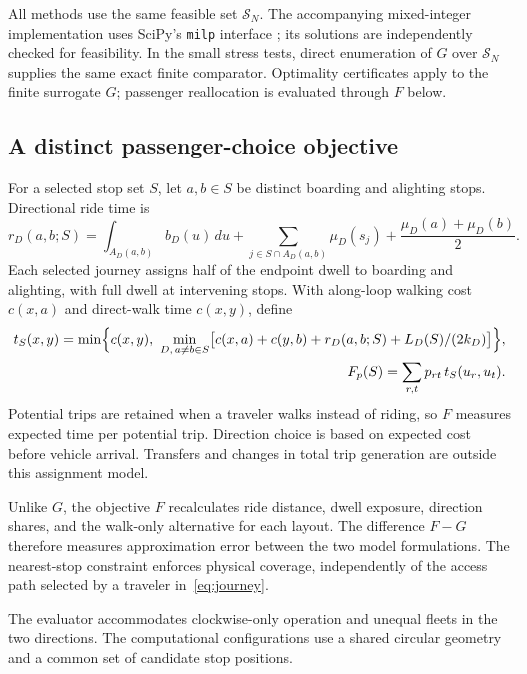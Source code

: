 \documentclass[11pt]{article}
\theoremstyle{remark}\newtheorem{remark}[theorem]{Remark}
\newcommand{\Sset}{\mathcal S_N}
\begin{document}
All methods use the same feasible set $\Sset$. The accompanying mixed-integer implementation uses SciPy's \texttt{milp} interface \cite{scipy}; its solutions are independently checked for feasibility. In the small stress tests, direct enumeration of $G$ over $\Sset$ supplies the same exact finite comparator. Optimality certificates apply to the finite surrogate $G$; passenger reallocation is evaluated through $F$ below.

\subsection{A distinct passenger-choice objective}\label{sec:reassign}
For a selected stop set $S$, let $a,b\in S$ be distinct boarding and alighting stops. Directional ride time is
\begin{equation}
r_D(a,b;S)=\int_{A_D(a,b)}b_D(u)\,du
+\sum_{j\in S\cap A_D(a,b)}\mu_D(s_j)
+\frac{\mu_D(a)+\mu_D(b)}2.\label{eq:ride}
\end{equation}
Each selected journey assigns half of the endpoint dwell to boarding and alighting, with full dwell at intervening stops. With along-loop walking cost $c(x,a)$ and direct-walk time $c(x,y)$, define
\begin{align}
t_S(x,y)=\min\Bigl\{c(x,y),\ 
\min_{D,\,a\ne b\in S}\bigl[c(x,a)+c(y,b)+r_D(a,b;S)+L_D(S)/(2k_D)\bigr]\Bigr\},\label{eq:journey}\\
F_p(S)=\sum_{r,t}p_{rt}\,t_S(u_r,u_t).\label{eq:F}
\end{align}
Potential trips are retained when a traveler walks instead of riding, so $F$ measures expected time per potential trip. Direction choice is based on expected cost before vehicle arrival. Transfers and changes in total trip generation are outside this assignment model.

Unlike $G$, the objective $F$ recalculates ride distance, dwell exposure, direction shares, and the walk-only alternative for each layout. The difference $F-G$ therefore measures approximation error between the two model formulations. The nearest-stop constraint enforces physical coverage, independently of the access path selected by a traveler in~\eqref{eq:journey}.

The evaluator accommodates clockwise-only operation and unequal fleets in the two directions. The computational configurations use a shared circular geometry and a common set of candidate stop positions.
\end{document}
